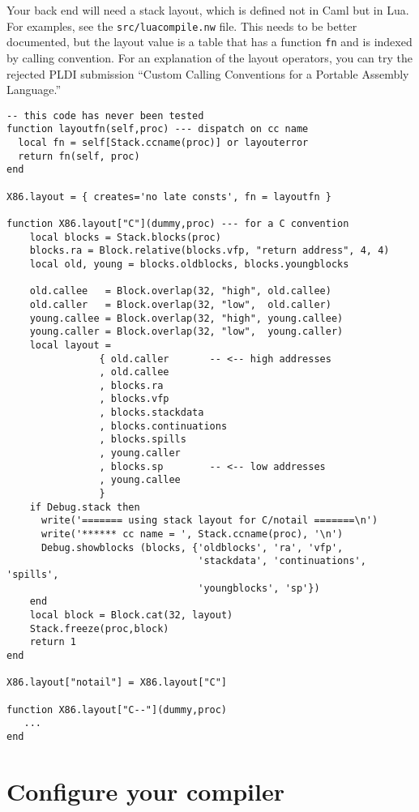 \documentclass[12pt]{article}
\begin{document}
Your back end will need a stack layout, which is defined not in Caml
but in Lua.
For examples, see the \texttt{src/luacompile.nw} file.
This needs to be better documented, but the layout value is a table
that has a function \texttt{fn} and is indexed by calling convention. 
For an explanation of the layout operators, you can
try the rejected PLDI submission ``Custom Calling Conventions for a
Portable Assembly Language.''
\begin{verbatim}
-- this code has never been tested
function layoutfn(self,proc) --- dispatch on cc name
  local fn = self[Stack.ccname(proc)] or layouterror
  return fn(self, proc)
end

X86.layout = { creates='no late consts', fn = layoutfn }

function X86.layout["C"](dummy,proc) --- for a C convention 
    local blocks = Stack.blocks(proc)
    blocks.ra = Block.relative(blocks.vfp, "return address", 4, 4)
    local old, young = blocks.oldblocks, blocks.youngblocks

    old.callee   = Block.overlap(32, "high", old.callee)
    old.caller   = Block.overlap(32, "low",  old.caller)
    young.callee = Block.overlap(32, "high", young.callee)
    young.caller = Block.overlap(32, "low",  young.caller)
    local layout = 
                { old.caller       -- <-- high addresses
                , old.callee
                , blocks.ra
                , blocks.vfp
                , blocks.stackdata
                , blocks.continuations
                , blocks.spills
                , young.caller
                , blocks.sp        -- <-- low addresses 
                , young.callee
                }
    if Debug.stack then
      write('======= using stack layout for C/notail =======\n')
      write('****** cc name = ', Stack.ccname(proc), '\n')
      Debug.showblocks (blocks, {'oldblocks', 'ra', 'vfp',
                                 'stackdata', 'continuations', 'spills',
                                 'youngblocks', 'sp'})
    end
    local block = Block.cat(32, layout)
    Stack.freeze(proc,block)
    return 1
end    

X86.layout["notail"] = X86.layout["C"]

function X86.layout["C--"](dummy,proc)
   ...
end    
\end{verbatim}


\section{Configure your compiler}
\end{document}

